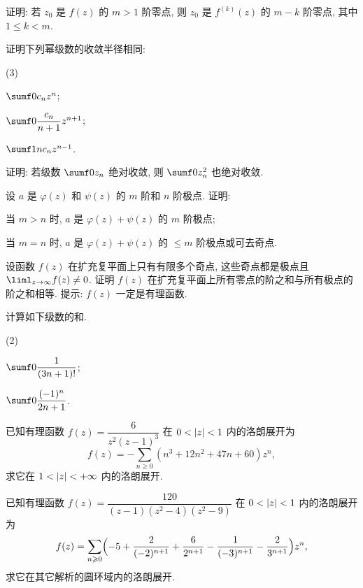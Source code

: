 \begin{homework}
\begin{homework}
    \item 证明: 若 $z_0$ 是 $f(z)$ 的 $m>1$ 阶零点, 则 $z_0$ 是 $f^{(k)}(z)$ 的 $m-k$ 阶零点, 其中 $1\le k<m$.
    \item 证明下列幂级数的收敛半径相同:
      \begin{subhomework}(3)
        \item $\sumf0 c_nz^n$;
        \item $\sumf0 \dfrac{c_n}{n+1}z^{n+1}$;
        \item $\sumf1 nc_nz^{n-1}$.
      \end{subhomework}
    \item 证明: 若级数 $\sumf0 z_n$ 绝对收敛, 则 $\sumf0 z_n^2$ 也绝对收敛.
    \item 设 $a$ 是 $\varphi(z)$ 和 $\psi(z)$ 的 $m$ 阶和 $n$ 阶极点. 证明:
      \begin{subhomework}
        \item 当 $m>n$ 时, $a$ 是 $\varphi(z)+\psi(z)$ 的 $m$ 阶极点;
        \item 当 $m=n$ 时, $a$ 是 $\varphi(z)+\psi(z)$ 的 $\le m$ 阶极点或可去奇点.
      \end{subhomework}
    \item 设函数 $f(z)$ 在扩充复平面上只有有限多个奇点, 这些奇点都是极点且 $\liml_{z\ra\infty}f(z)\neq0$.
      证明 $f(z)$ 在扩充复平面上所有零点的阶之和与所有极点的阶之和相等. 提示: $f(z)$ 一定是有理函数.
    \item \optionalex 计算如下级数的和.
    \begin{subhomework}(2)
      \item $\sumf0 \dfrac1{(3n+1)!}$;
      \item $\sumf0 \dfrac{(-1)^n}{2n+1}$.
    \end{subhomework}
    \item \optionalex 已知有理函数 $f(z)=\dfrac{6}{z^2(z-1)^3}$ 在 $0<\abs{z}<1$ 内的洛朗展开为
      \[
        f(z)=-\sum_{n\ge 0}(n^3+12n^2+47n+60)z^n,
      \]
      求它在 $1<\abs{z}<+\infty$ 内的洛朗展开.
    \item \optionalex 已知有理函数 $f(z)=\dfrac{120}{(z-1)(z^2-4)(z^2-9)}$ 在 $0<\abs{z}<1$ 内的洛朗展开为
      \[
        f(z)=\sum_{n\ge 0}\Bigl(-5+\frac2{(-2)^{n+1}}+\frac6{2^{n+1}}-\frac1{(-3)^{n+1}}-\frac2{3^{n+1}}\Bigr)z^n,
      \]
      求它在其它解析的圆环域内的洛朗展开.
  \end{homework}
\end{homework}
\finishwidepage
